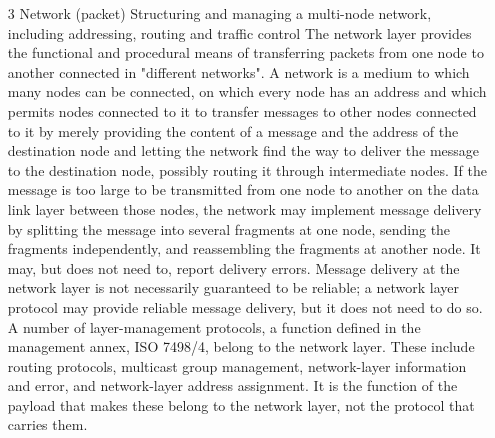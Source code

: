 \documentclass{article}
\begin{document}
\begin{enumerate}[label = \arabic*]
\item[3] Network (packet) Structuring and managing a multi-node network, including addressing, routing and traffic control
	\subitem The network layer provides the functional and procedural means of transferring packets from one node to another connected in "different networks". A network is a medium to which many nodes can be connected, on which every node has an address and which permits nodes connected to it to transfer messages to other nodes connected to it by merely providing the content of a message and the address of the destination node and letting the network find the way to deliver the message to the destination node, possibly routing it through intermediate nodes. If the message is too large to be transmitted from one node to another on the data link layer between those nodes, the network may implement message delivery by splitting the message into several fragments at one node, sending the fragments independently, and reassembling the fragments at another node. It may, but does not need to, report delivery errors. Message delivery at the network layer is not necessarily guaranteed to be reliable; a network layer protocol may provide reliable message delivery, but it does not need to do so. A number of layer-management protocols, a function defined in the management annex, ISO 7498/4, belong to the network layer. These include routing protocols, multicast group management, network-layer information and error, and network-layer address assignment. It is the function of the payload that makes these belong to the network layer, not the protocol that carries them.


\end{enumerate}
\end{document}
